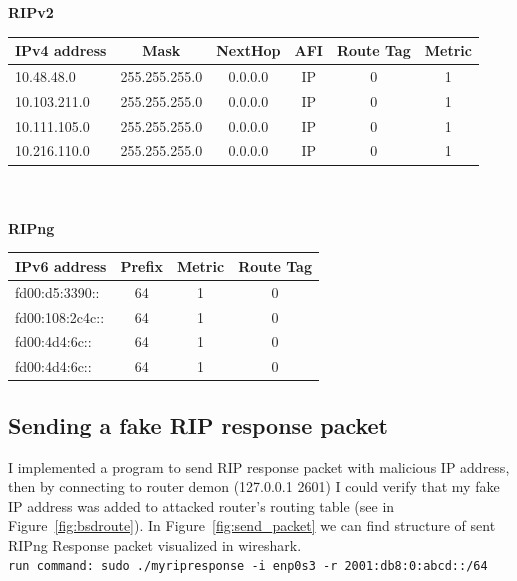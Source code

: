\documentclass[11pt,a4paper]{article}
\begin{document}
\textbf{RIPv2}\\
\begin{tabular}{lccccc}
IPv4 address     & Mask  & NextHop & AFI & Route Tag & Metric\\
\hline
10.48.48.0 		& 255.255.255.0 & 0.0.0.0 & IP & 0 & 1\\
10.103.211.0    & 255.255.255.0 & 0.0.0.0 & IP & 0 & 1\\
10.111.105.0    & 255.255.255.0 & 0.0.0.0 & IP & 0 & 1\\
10.216.110.0    & 255.255.255.0 & 0.0.0.0 & IP & 0 & 1\\
\end{tabular}
\\
\\

\noindent
\textbf{RIPng}\\
\begin{tabular}{lccc}
IPv6 address     & Prefix   & Metric & Route Tag \\
\hline
fd00:d5:3390:: 		& 64  & 1 & 0  \\
fd00:108:2c4c::    & 64  & 1 & 0   \\
fd00:4d4:6c::    & 64  & 1 & 0   \\
fd00:4d4:6c::    & 64  & 1 & 0   \\
\end{tabular}


\subsection{Sending a fake RIP response packet}
I implemented a program to send RIP response packet with malicious IP address, then by connecting to router demon (127.0.0.1 2601) I could verify that my fake IP address was added to attacked router's routing table (see in Figure~\ref{fig:bsdroute}). In Figure~\ref{fig:send_packet} we can find structure of sent RIPng Response packet visualized in wireshark. \\
\noindent
\texttt{run command: sudo ./myripresponse -i enp0s3 -r  2001:db8:0:abcd::/64}
\end{document}
